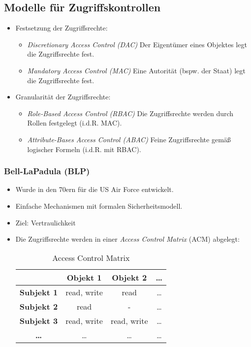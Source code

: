 		\subsection{Modelle für Zugriffskontrollen}
			\begin{itemize}
				\item Festsetzung der Zugriffsrechte:
					\begin{itemize}
						\item \textit{Discretionary Access Control (DAC)}    \tabto{4cm} Der Eigentümer eines Objektes legt die Zugriffsrechte fest.
						\item \textit{Mandatory Access Control (MAC)}        \tabto{4cm} Eine Autorität (bspw. der Staat) legt die Zugriffsrechte fest.
					\end{itemize}
				\item Granularität der Zugriffsrechte:
					\begin{itemize}
						\item \textit{Role-Based Access Control (RBAC)}      \tabto{4cm} Die Zugriffsrechte werden durch Rollen festgelegt (i.d.R. MAC).
						\item \textit{Attribute-Bases Access Control (ABAC)} \tabto{4cm} Feine Zugriffsrechte gemäß logischer Formeln (i.d.R. mit RBAC).
					\end{itemize}
			\end{itemize}

		\subsubsection{Bell-LaPadula (BLP)}
			\begin{itemize}
				\item Wurde in den 70ern für die US Air Force entwickelt.
				\item Einfache Mechanismen mit formalen Sicherheitsmodell.
				\item Ziel: Vertraulichkeit
				\item Die Zugriffsrechte werden in einer \textit{Access Control Matrix} (ACM) abgelegt:
					\begin{table}[H]
						\centering
						\begin{tabular}{| c | c | c | c |}
							\hline
							                   & \textbf{Objekt 1} & \textbf{Objekt 2} & \textbf{\dots} \\ \hline
							\textbf{Subjekt 1} & read, write       & read              & \dots          \\ \hline
							\textbf{Subjekt 2} & read              & -                 & \dots          \\ \hline
							\textbf{Subjekt 3} & read, write       & read, write       & \dots          \\ \hline
							\textbf{\dots}     & \dots             & \dots             & \dots          \\ \hline
						\end{tabular}
						\caption{Access Control Matrix}
					\end{table}
			\end{itemize}

